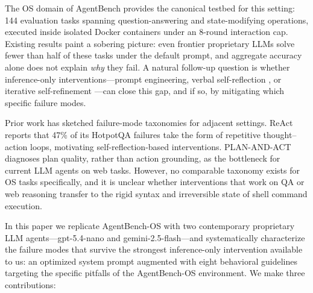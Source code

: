 \documentclass[11pt]{article}
\begin{document}
The OS domain of AgentBench \citep{liu2023agentbench} provides the
canonical testbed for this setting: 144 evaluation tasks spanning
question-answering and state-modifying operations, executed inside
isolated Docker containers under an 8-round interaction cap. Existing
results paint a sobering picture: even frontier proprietary LLMs solve
fewer than half of these tasks under the default prompt, and aggregate
accuracy alone does not explain \emph{why} they fail. A natural
follow-up question is whether inference-only interventions---prompt
engineering, verbal self-reflection \citep{shinn2023reflexion}, or
iterative self-refinement \citep{madaan2023selfrefine}---can close this
gap, and if so, by mitigating which specific failure modes.

Prior work has sketched failure-mode taxonomies for adjacent settings.
ReAct \citep{yao2022react} reports that 47\% of its HotpotQA failures
take the form of repetitive thought--action loops, motivating
self-reflection-based interventions. PLAN-AND-ACT
\citep{erdogan2025plan} diagnoses plan quality, rather than action
grounding, as the bottleneck for current LLM agents on web tasks.
However, no comparable taxonomy exists for OS tasks specifically, and it
is unclear whether interventions that work on QA or web reasoning
transfer to the rigid syntax and irreversible state of shell command
execution.

In this paper we replicate AgentBench-OS with two contemporary
proprietary LLM agents---gpt-5.4-nano and gemini-2.5-flash---and
systematically characterize the failure modes that survive the strongest
inference-only intervention available to us: an optimized system prompt
augmented with eight behavioral guidelines targeting the specific
pitfalls of the AgentBench-OS environment. We make three contributions:
\end{document}
